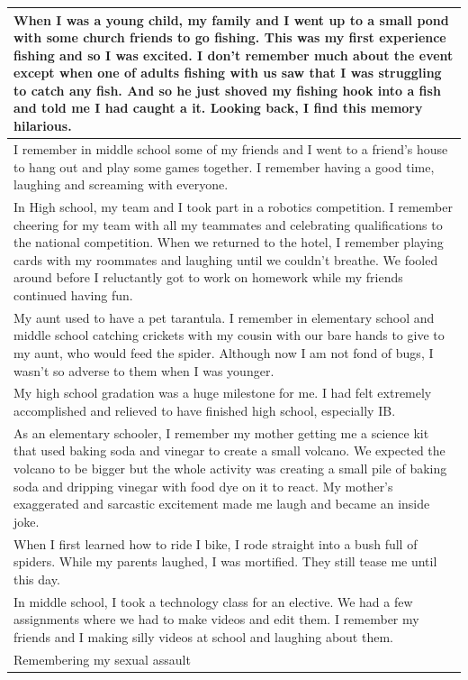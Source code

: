 \documentclass[
  .7em,
  letterpaper,
  DIV=11,
  numbers=noendperiod]{scrartcl}
\begin{document}
\begin{table}
\begin{tabular}{l}
\hline
When I was a young child, my family and I went up to a small pond with some church friends to go fishing. This was my first experience fishing and so I was excited. I don’t remember much about the event except when one of adults fishing with us saw that I was struggling to catch any fish. And so he just shoved my fishing hook into a fish and told me I had caught a it. Looking back, I find this memory hilarious.\\
\hline
I remember in middle school some of my friends and I went to a friend’s house to hang out and play some games together. I remember having a good time, laughing and screaming with everyone.\\
\hline
In High school, my team and I took part in a robotics competition. I remember cheering for my team with all my teammates and celebrating qualifications to the national competition. When we returned to the hotel, I remember playing cards with my roommates and laughing until we couldn’t breathe. We fooled around before I reluctantly got to work on homework while my friends continued having fun.\\
\hline
My aunt used to have a pet tarantula. I remember in elementary school and middle school catching crickets with my cousin with our bare hands to give to my aunt, who would feed the spider. Although now I am not fond of bugs, I wasn’t so adverse to them when I was younger.\\
\hline
My high school gradation was a huge milestone for me. I had felt extremely accomplished and relieved to have finished high school, especially IB.\\
\hline
As an elementary schooler, I remember my mother getting me a science kit that used baking soda and vinegar to create a small volcano. We expected the volcano to be bigger but the whole activity was creating a small pile of baking soda and dripping vinegar with food dye on it to react. My mother’s exaggerated and sarcastic excitement made me laugh and became an inside joke.\\
\hline
When I first learned how to ride I bike, I rode straight into a bush full of spiders. While my parents laughed, I was mortified. They still tease me until this day.\\
\hline
In middle school, I took a technology class for an elective. We had a few assignments where we had to make videos and edit them. I remember my friends and I making silly videos at school and laughing about them.\\
\hline
Remembering my sexual assault\\

\end{tabular}
\end{table}
\end{document}
